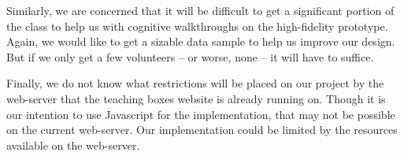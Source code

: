 \documentclass[11pt,letter]{article}
\begin{document}
Similarly, we are concerned that it will be difficult to get a significant
portion of the class to help us with cognitive walkthroughs on the high-fidelity
prototype. Again, we would like to get a sizable data sample to help us improve
our design. But if we only get a few volunteers -- or worse, none -- it will
have to suffice.

Finally, we do not know what restrictions will be placed on our project by the
web-server that the teaching boxes website is already running on. Though it is
our intention to use Javascript for the implementation, that may not be possible
on the current web-server. Our implementation could be limited by the resources
available on the web-server.
\end{document}
